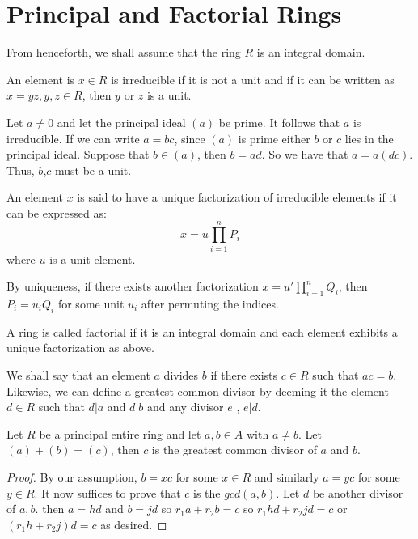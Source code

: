 \documentclass[main.tex]{subfiles}
\begin{document}
\section{Principal and Factorial Rings}

From henceforth, we shall assume that the ring $R$ is an integral domain.

\begin{definition}
 An element is $x \in R$ is irreducible if it is not a unit and if it can be written as $x = yz, y,z \in R$, then $y$ or $z$ is a unit. 
\end{definition}

Let $a \neq 0$ and let the principal ideal $(a)$ be prime. It follows that $a$ is irreducible. If we can write $a = bc$, since $(a)$ is prime either $b$ or $c$ lies in the principal ideal. Suppose that $b \in (a)$, then $b = ad$. So we have that 
$a = a(dc)$. Thus, $b$,$c$ must be a unit.

\begin{definition}
 An element $x$ is said to have a unique factorization of irreducible elements if it can be expressed as:
 $$ x = u \prod_{i=1}^n P_i $$
 where $u$ is a unit element.
\end{definition}

By uniqueness, if there exists another factorization $x = u' \prod_{i=1}^n Q_i$, then $P_i = u_iQ_i$ for some unit $u_i$ after permuting the indices.

\begin{definition}
 A ring is called factorial if it is an integral domain and each element exhibits a unique factorization as above. 
\end{definition}

We shall say that an element $a$ divides $b$ if there exists $c \in R$ such that $ac = b$. Likewise, we can define a greatest common divisor by deeming it the element $d \in R$ such that $d|a$ and $d|b$ and any divisor $e$ , $e|d$.

\begin{proposition}
 Let $R$ be a principal entire ring and let $a,b \in A$ with $a \neq b$. Let $(a) +(b) = (c)$, then $c$ is the greatest common divisor of $a$ and $b$. 
\end{proposition}

\begin{proof}
By our assumption, $b = xc$ for some $x \in R$ and similarly $a = yc$ for some $y \in R$. It now suffices to prove that $c$ is the $gcd(a,b)$. Let $d$ be another divisor of $a,b$. then $a = hd$ and $b = jd$ so $r_1a + r_2b = c$ so $r_1hd + r_2jd = c$ or $(r_1h + r_2j)d = c$ as desired.
\end{proof}
\end{document}
